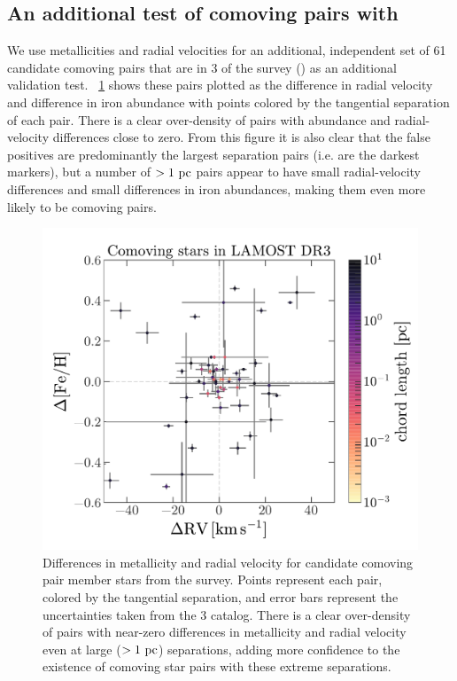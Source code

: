 \documentclass[modern, letterpaper]{aastex61}
\newcommand{\DR}[1]{\acronym{DR}#1}
\begin{document}
\subsection{An additional test of comoving pairs with }

We use metallicities and radial velocities for an additional, independent set of
61 candidate comoving pairs that are in
\DR{3} of the  survey (\citealt{Deng:2012}) as an additional
validation test.
\figurename~\ref{fig:lamost} shows these pairs plotted as the difference in
radial velocity and difference in iron abundance with points colored by the
tangential separation of each pair.
There is a clear over-density of pairs with abundance and radial-velocity
differences close to zero.
From this figure it is also clear that the false positives are predominantly the
largest separation pairs (i.e. are the darkest markers), but a number of
$>1~\mathrm{pc}$ pairs appear to have small radial-velocity differences and small
differences in iron abundances, making them even more likely to be comoving
pairs.

\begin{figure}[htbp]
  \begin{center}
    \includegraphics[width=0.65\linewidth]{lamost.pdf}
  \end{center}
  \caption{%
    Differences in metallicity and radial velocity for candidate comoving pair
    member stars from the  survey.
    Points represent each pair, colored by the tangential separation, and
    error bars represent the uncertainties taken from the 
    \DR{3} catalog.
    There is a clear over-density of pairs with near-zero differences in
    metallicity and radial velocity even at large ($>1~\mathrm{pc}$) separations, adding
    more confidence to the existence of comoving star pairs with these extreme
    separations.
    \label{fig:lamost}}
\end{figure}
\end{document}
